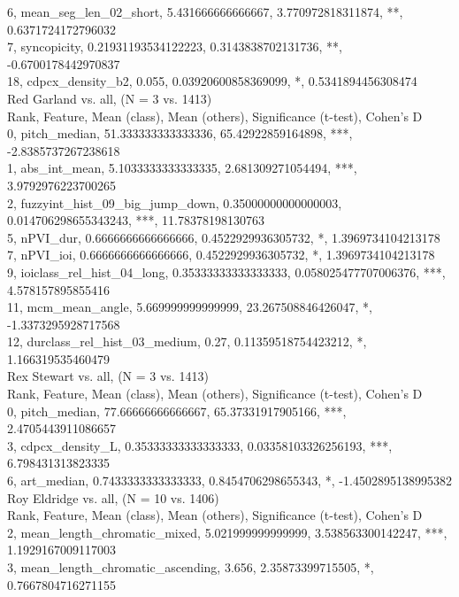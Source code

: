6, mean_seg_len_02_short, 5.431666666666667, 3.770972818311874, **, 0.6371724172796032\\
7, syncopicity, 0.21931193534122223, 0.3143838702131736, **, -0.6700178442970837\\
18, cdpcx_density_b2, 0.055, 0.03920600858369099, *, 0.5341894456308474\\
Red Garland vs. all, (N = 3 vs. 1413)\\
Rank, Feature, Mean (class), Mean (others), Significance (t-test), Cohen's D\\
0, pitch_median, 51.333333333333336, 65.42922859164898, ***, -2.8385737267238618\\
1, abs_int_mean, 5.1033333333333335, 2.681309271054494, ***, 3.9792976223700265\\
2, fuzzyint_hist_09_big_jump_down, 0.35000000000000003, 0.014706298655343243, ***, 11.78378198130763\\
5, nPVI_dur, 0.6666666666666666, 0.4522929936305732, *, 1.3969734104213178\\
7, nPVI_ioi, 0.6666666666666666, 0.4522929936305732, *, 1.3969734104213178\\
9, ioiclass_rel_hist_04_long, 0.35333333333333333, 0.058025477707006376, ***, 4.578157895855416\\
11, mcm_mean_angle, 5.669999999999999, 23.267508846426047, *, -1.3373295928717568\\
12, durclass_rel_hist_03_medium, 0.27, 0.11359518754423212, *, 1.166319535460479\\
Rex Stewart vs. all, (N = 3 vs. 1413)\\
Rank, Feature, Mean (class), Mean (others), Significance (t-test), Cohen's D\\
0, pitch_median, 77.66666666666667, 65.37331917905166, ***, 2.4705443911086657\\
3, cdpcx_density_L, 0.35333333333333333, 0.03358103326256193, ***, 6.798431313823335\\
6, art_median, 0.7433333333333333, 0.8454706298655343, *, -1.4502895138995382\\
Roy Eldridge vs. all, (N = 10 vs. 1406)\\
Rank, Feature, Mean (class), Mean (others), Significance (t-test), Cohen's D\\
2, mean_length_chromatic_mixed, 5.021999999999999, 3.538563300142247, ***, 1.1929167009117003\\
3, mean_length_chromatic_ascending, 3.656, 2.35873399715505, *, 0.7667804716271155\\
